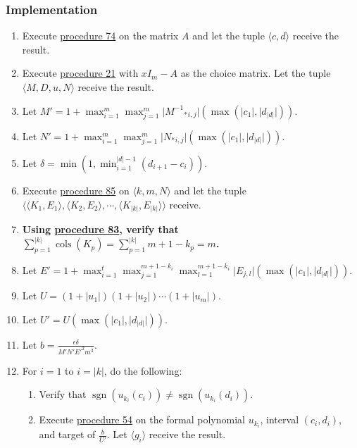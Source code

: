 \documentclass[twocolumn]{article}
\DeclareMathOperator{\sgn}{sgn}
\DeclareMathOperator{\cols}{cols}
\begin{document}
			\subsubsection{Implementation}
				\begin{enumerate}
					\item Execute \hyperref[sec:procedure 74]{procedure 74} on the matrix $A$ and let the tuple $\langle c,d\rangle$ receive the result.
					\item Execute \hyperref[sec:procedure 21]{procedure 21} with $xI_m-A$ as the choice matrix. Let the tuple $\langle M,D,u,N\rangle$ receive the result.
					\item Let $M'=1+\max_{i=1}^m\max_{j=1}^m\lvert {{M^{-1}}_*}_{i,j}\rvert(\max(\lvert c_1\rvert,\lvert d_{\lvert d\rvert}\rvert))$.
					\item Let $N'=1+\max_{i=1}^m\max_{j=1}^m\lvert {N_*}_{i,j}\rvert(\max(\lvert c_1\rvert,\lvert d_{\lvert d\rvert}\rvert))$.
					\item Let $\delta=\min(1,\min_{i=1}^{\lvert d\rvert-1}(d_{i+1}-c_i))$.
					\item Execute \hyperref[sec:procedure 85]{procedure 85} on $\langle k,m,N\rangle$ and let the tuple $\langle\langle K_1,E_1\rangle,\langle K_2,E_2\rangle,\cdots,\langle K_{\lvert k\rvert},E_{\lvert k\rvert}\rangle\rangle$ receive.
					\item \textbf{Using \hyperref[sec:procedure 83]{procedure 83}, verify that $\sum_{p=1}^{\lvert k\rvert}\cols(K_p)=\sum_{p=1}^{\lvert k\rvert} m+1-k_p=m$.}
					\item Let $E'=1+\max_{i=1}^t\max_{j=1}^{m+1-k_i}\max_{l=1}^{m+1-k_i}\lvert E_{j,l}\rvert(\max(\lvert c_1\rvert,\lvert d_{\lvert d\rvert}\rvert))$.
					\item Let $U=(1+\lvert u_1\rvert)(1+\lvert u_2\rvert)\cdots(1+\lvert u_m\rvert)$.
					\item Let $U'=U(\max(\lvert c_1\rvert,\lvert d_{\lvert d\rvert}\rvert))$.
					\item Let $b=\frac{\epsilon\delta}{M'N'E'^2m^3}$.
					\item For $i=1$ to $i=\lvert k\rvert$, do the following:
					\begin{enumerate}
						\item Verify that $\sgn(u_{k_i}(c_i))\ne\sgn(u_{k_i}(d_i))$.
						\item Execute \hyperref[sec:procedure 54]{procedure 54} on the formal polynomial $u_{k_i}$, interval $(c_i, d_i)$, and target of $\frac{b}{U'}$. Let $\langle g_i\rangle$ receive the result.

\end{enumerate}
\end{enumerate}
\end{document}
